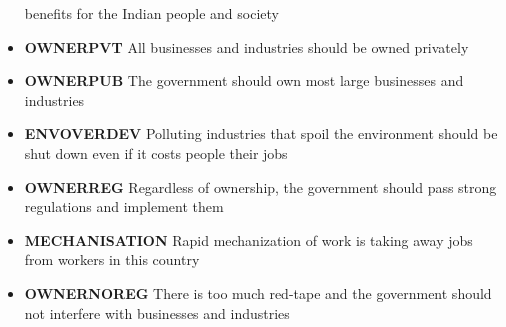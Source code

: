 \documentclass[
]{article}
\begin{document}
\begin{itemize}
  benefits for the Indian people and society
\item
  \textbf{OWNERPVT} All businesses and industries should be owned
  privately
\item
  \textbf{OWNERPUB} The government should own most large businesses and
  industries
\item
  \textbf{ENVOVERDEV} Polluting industries that spoil the environment
  should be shut down even if it costs people their jobs
\item
  \textbf{OWNERREG} Regardless of ownership, the government should pass
  strong regulations and implement them
\item
  \textbf{MECHANISATION} Rapid mechanization of work is taking away jobs
  from workers in this country
\item
  \textbf{OWNERNOREG} There is too much red-tape and the government
  should not interfere with businesses and industries
\end{itemize}
\end{document}
